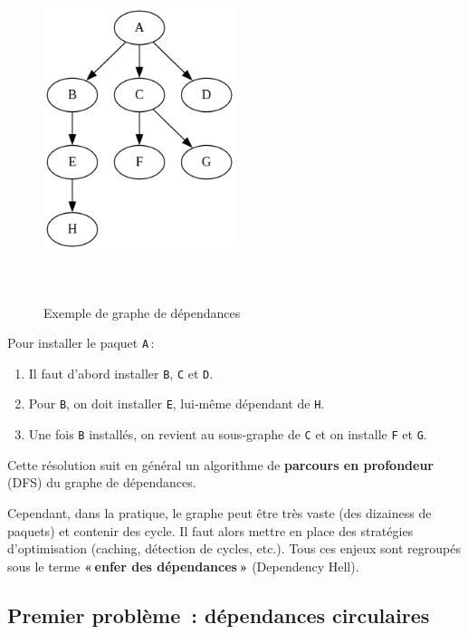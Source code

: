\begin{figure}[H]
  \centering
  \includegraphics[width=0.5\textwidth , height=10cm]{images_pfe/genralgraphexemple.png}
  \caption{Exemple de graphe de dépendances}
  \label{fig:exempledepndencygraph}
\end{figure}


Pour installer le paquet \texttt{A} :
\begin{enumerate}
  \item Il faut d’abord installer \texttt{B}, \texttt{C} et \texttt{D}.
  \item Pour \texttt{B}, on doit installer \texttt{E}, lui‑même dépendant de \texttt{H}.
  \item Une fois \texttt{B}  installés, on revient au sous‑graphe de \texttt{C} et on installe \texttt{F} et \texttt{G}.
\end{enumerate}

Cette résolution suit en général un algorithme de \textbf{parcours en profondeur} (DFS) du graphe de dépendances.  

Cependant, dans la pratique, le graphe peut être très vaste (des dizainess de paquets) et contenir  des cycle. Il faut alors mettre en place des stratégies d’optimisation (caching, détection de cycles, etc.). Tous ces enjeux sont regroupés sous le terme \textbf{« enfer des dépendances »} (Dependency Hell).


\subsection{Premier problème : dépendances circulaires}
\label{subsec:circular-dependencies}

